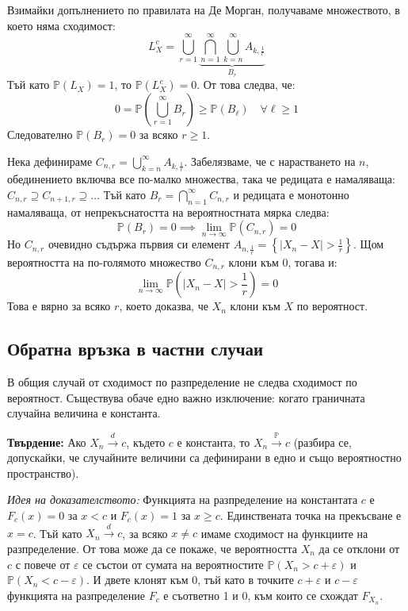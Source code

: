 \documentclass{article}
\begin{document}
Взимайки допълнението по правилата на Де Морган, получаваме множеството, в което няма сходимост:
\[
L_X^c = \bigcup_{r=1}^{\infty} \underbrace{\bigcap_{n=1}^{\infty} \bigcup_{k=n}^{\infty} A_{k, \frac{1}{r}}}_{B_r}
\]
Тъй като $\mathbb{P}(L_X) = 1$, то $\mathbb{P}(L_X^c) = 0$. От това следва, че:
\[
0 = \mathbb{P}\left(\bigcup_{r=1}^{\infty} B_r\right) \ge \mathbb{P}(B_\ell) \quad \forall \ell \ge 1
\]
Следователно $\mathbb{P}(B_r) = 0$ за всяко $r \ge 1$. 

Нека дефинираме $C_{n, r} = \bigcup_{k=n}^{\infty} A_{k, \frac{1}{r}}$. Забелязваме, че с нарастването на $n$, обединението включва все по-малко множества, така че редицата е намаляваща: $C_{n, r} \supseteq C_{n+1, r} \supseteq \dots$
Тъй като $B_r = \bigcap_{n=1}^{\infty} C_{n, r}$ и редицата е монотонно намаляваща, от непрекъснатостта на вероятностната мярка следва:
\[
\mathbb{P}(B_r) = 0 \implies \lim_{n\to\infty} \mathbb{P}(C_{n, r}) = 0
\]
Но $C_{n, r}$ очевидно съдържа първия си елемент $A_{n, \frac{1}{r}} = \left\{ |X_n - X| > \frac{1}{r} \right\}$. Щом вероятността на по-голямото множество $C_{n, r}$ клони към 0, тогава и:
\[
\lim_{n\to\infty} \mathbb{P}\left(|X_n - X| > \frac{1}{r}\right) = 0
\]
Това е вярно за всяко $r$, което доказва, че $X_n$ клони към $X$ по вероятност.

\subsection{Обратна връзка в частни случаи}
В общия случай от сходимост по разпределение не следва сходимост по вероятност. Съществува обаче едно важно изключение: когато граничната случайна величина е константа.

\textbf{Твърдение:} Ако $X_n \xrightarrow{d} c$, където $c$ е константа, то $X_n \xrightarrow{\mathbb{P}} c$ (разбира се, допускайки, че случайните величини са дефинирани в едно и също вероятностно пространство).

\emph{Идея на доказателството:} Функцията на разпределение на константата $c$ е $F_c(x) = 0$ за $x < c$ и $F_c(x) = 1$ за $x \ge c$. Единствената точка на прекъсване е $x=c$. Тъй като $X_n \xrightarrow{d} c$, за всяко $x \neq c$ имаме сходимост на функциите на разпределение. От това може да се покаже, че вероятността $X_n$ да се отклони от $c$ с повече от $\varepsilon$ се състои от сумата на вероятностите $\mathbb{P}(X_n > c + \varepsilon)$ и $\mathbb{P}(X_n < c - \varepsilon)$. И двете клонят към 0, тъй като в точките $c+\varepsilon$ и $c-\varepsilon$ функцията на разпределение $F_c$ е съответно 1 и 0, към които се схождат $F_{X_n}$.
\end{document}
